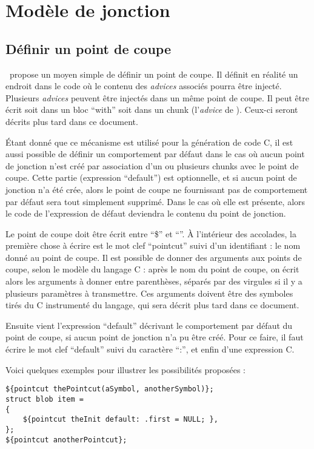 \documentclass[french]{rtxreport}
\begin{document}
\section{Modèle de jonction}

\subsection{Définir un point de coupe}

\rtx\ propose un moyen simple de définir un point de coupe. Il définit en
réalité un endroit dans le code où le contenu des \emph{advices} associés
pourra être injecté. Plusieurs \emph{advices} peuvent être injectés dans un
même point de coupe. Il peut être écrit soit dans un bloc ``with'' soit dans un
chunk (l'\emph{advice} de \rtx).  Ceux-ci seront décrits plus tard dans ce
document.

Étant donné que ce mécanisme est utilisé pour la génération de code C, il est
aussi possible de définir un comportement par défaut dans le cas où aucun point
de jonction n'est créé par association d'un ou plusieurs chunks avec le point
de coupe. Cette partie (expression ``default'') est optionnelle, et si aucun
point de jonction n'a été crée, alors le point de coupe ne fournissant pas de
comportement par défaut sera tout simplement supprimé. Dans le cas où elle est
présente, alors le code de l'expression de défaut deviendra le contenu du point
de jonction.

Le point de coupe doit être écrit entre ``\${'' et ``}''. À l'intérieur des
accolades, la première chose à écrire est le mot clef ``pointcut'' suivi d'un
identifiant : le nom donné au point de coupe. Il est possible de donner des
arguments aux points de coupe, selon le modèle du langage C : après le nom du
point de coupe, on écrit alors les arguments à donner entre parenthèses,
séparés par des virgules si il y a plusieurs paramètres à transmettre. Ces
arguments doivent être des symboles tirés du C instrumenté du langage, qui sera
décrit plus tard dans ce document.

Ensuite vient l'expression ``default'' décrivant le comportement par défaut du
point de coupe, si aucun point de jonction n'a pu être créé. Pour ce faire, il
faut écrire le mot clef ``default'' suivi du caractère ``:'', et enfin d'une
expression C.

Voici quelques exemples pour illustrer les possibilités proposées :
\begin{lstlisting}
${pointcut thePointcut(aSymbol, anotherSymbol)};
struct blob item =
{
    ${pointcut theInit default: .first = NULL; },
};
${pointcut anotherPointcut};
\end{lstlisting}
\end{document}
